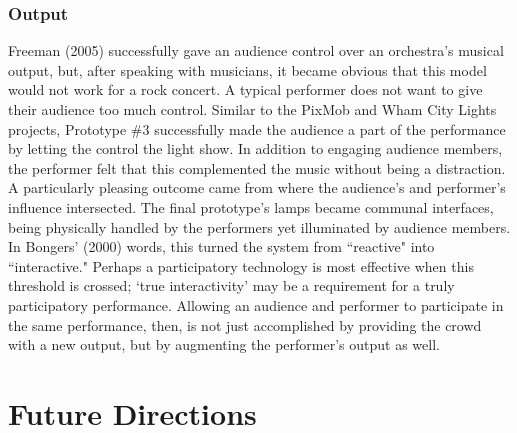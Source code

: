 \subsubsection{Output}

Freeman (2005) successfully gave an audience control over an orchestra's musical output, but, after speaking with musicians, it became obvious that this model would not work for a rock concert. A typical performer does not want to give their audience too much control. Similar to the PixMob and Wham City Lights projects, Prototype \#3 successfully made the audience a part of the performance by letting the control the light show. In addition to engaging audience members, the performer felt that this complemented the music without being a distraction. A particularly pleasing outcome came from where the audience's and performer's influence intersected. The final prototype's lamps became communal interfaces, being physically handled by the performers yet illuminated by audience members. In Bongers' (2000) words, this turned the system from ``reactive" into ``interactive." Perhaps a participatory technology is most effective when this threshold is crossed; `true interactivity' may be a requirement for a truly participatory performance. Allowing an audience and performer to participate in the same performance, then, is not just accomplished by providing the crowd with a new output, but by augmenting the performer's output as well.


\section{Future Directions}


